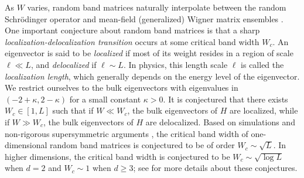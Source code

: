 \documentclass{article}
\newcommand{\1}{\mathds{1}}
\numberwithin{equation}{section}
\renewcommand{\geq}{\geqslant}
\renewcommand{\ge}{\geq}
\theoremstyle{plain} %
\theoremstyle{remark}
\begin{document}
As $W$ varies, random band matrices naturally interpolate between the random Schr\"odinger operator \cite{Anderson} and mean-field (generalized) Wigner matrix ensembles \cite{Wigner}. One important conjecture about random band matrices is that a sharp {\it localization-delocalization transition} occurs at some critical band width $W_c$. An eigenvector is said to be \emph{localized} if most of its weight resides in a region of scale $\ell \ll L$, and \emph{delocalized} if $\ell\sim L$. In physics, this length scale $\ell$ is called the \emph{localization length}, which generally depends on the energy level of the eigenvector. We restrict ourselves to the bulk eigenvectors with eigenvalues in $(-2+ \kappa, 2-\kappa)$ for a small constant $\kappa>0$. It is conjectured that there exists $W_c\in [1, L]$ such that if $W\ll W_c$, the bulk eigenvectors of $H$ are localized, while if $W\gg W_c$, the bulk eigenvectors of $H$ are delocalized. Based on simulations \cite{ConJ-Ref1, ConJ-Ref2, ConJ-Ref4, ConJ-Ref6} and non-rigorous supersymmetric arguments \cite{fy}, the critical band width of one-dimensional random band matrices is conjectured to be of order $W_c\sim \sqrt L$. In higher dimensions, the critical band width is conjectured to be $W_c\sim \sqrt{\log L}$ when $d=2$ and $W_c\sim 1$ when $d\ge 3$; see \cite{Spencer1,Spencer2,Spencer3, PB_review} for more details about these conjectures. 

\end{document}
